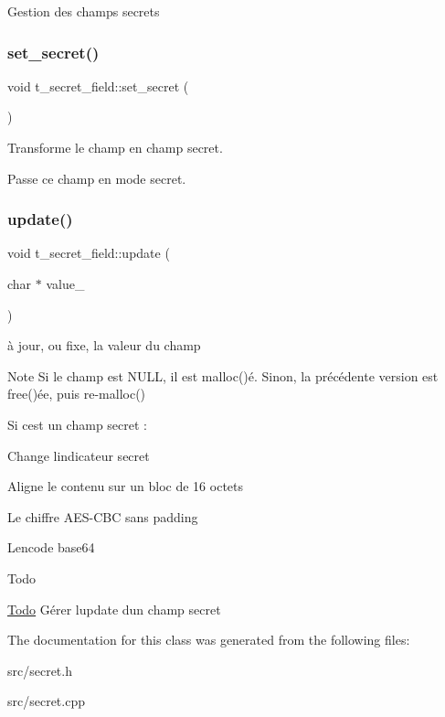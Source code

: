 Gestion des champs secrets \mbox{\label{classt__secret__field_abc856f06a23fdb25a86e50f49b37e238}} 
\subsubsection{\texorpdfstring{set\+\_\+secret()}{set\_secret()}}
{\footnotesize\ttfamily void t\+\_\+secret\+\_\+field\+::set\+\_\+secret (\begin{DoxyParamCaption}{ }\end{DoxyParamCaption})}



Transforme le champ en champ secret. 

Passe ce champ en mode \textquotesingle{}secret\textquotesingle{}. \mbox{\label{classt__secret__field_ae5d2d9cd45e310e33ccf9d3cc8da8bb1}} 
\subsubsection{\texorpdfstring{update()}{update()}}
{\footnotesize\ttfamily void t\+\_\+secret\+\_\+field\+::update (\begin{DoxyParamCaption}\item[{char $\ast$}]{value\+\_\+ }\end{DoxyParamCaption})}

à jour, ou fixe, la valeur du champ \begin{DoxyNote}{Note}
Si le champ est N\+U\+LL, il est malloc()é. Sinon, la précédente version est free()ée, puis re-\/malloc() 

Si c\textquotesingle{}est un champ secret \+:
\begin{DoxyItemize}
\item Change l\textquotesingle{}indicateur \textquotesingle{}secret\textquotesingle{}
\item Aligne le contenu sur un bloc de 16 octets
\item Le chiffre A\+E\+S-\/\+C\+BC sans padding
\item L\textquotesingle{}encode base64 
\end{DoxyItemize}
\end{DoxyNote}
\begin{DoxyRefDesc}{Todo}
\item[\hyperlink{todo__todo000010}{Todo}]Gérer l\textquotesingle{}update d\textquotesingle{}un champ secret \end{DoxyRefDesc}


The documentation for this class was generated from the following files\+:\begin{DoxyCompactItemize}
\item 
src/secret.\+h\item 
src/secret.\+cpp\end{DoxyCompactItemize}
